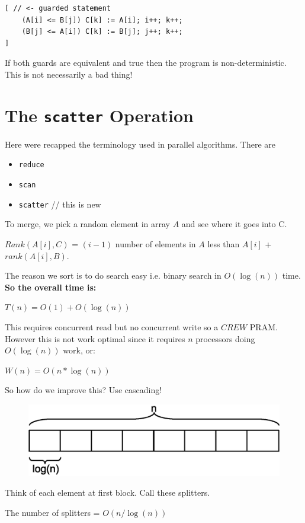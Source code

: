 \documentclass[twoside]{article}
\begin{document}
\begin{lstlisting}
[ // <- guarded statement
	(A[i] <= B[j]) C[k] := A[i]; i++; k++;
	(B[j] <= A[i]) C[k] := B[j]; j++; k++;
]
\end{lstlisting}
If both guards are equivalent and true then the program is non-deterministic. This is not necessarily a bad thing!

\section{The \texttt{scatter} Operation}
Here were recapped the terminology used in parallel algorithms. There are
\begin{itemize}
	\item \texttt{reduce}
	\item \texttt{scan}
	\item \texttt{scatter} // this is new
\end{itemize}

To merge, we pick a random element in array $A$ and see where it goes into C.

$Rank(A[i],C)$ = $(i-1)$ number of elements in $A$ less than $A[i]$ + $rank(A[i],B)$.

The reason we sort is to do search easy i.e. binary search in $O(\log(n))$ time.
\textbf{So the overall time is:}

$T(n) = O(1) + O(\log(n))$

This requires concurrent read but no concurrent write so a $CREW$ PRAM. However this is not work optimal since it requires $n$ processors doing $O(\log(n))$ work, or:

$W(n) = O(n * \log(n))$

So how do we improve this? Use cascading!

\begin{figure}[h]
\center
\includegraphics[scale=0.5]{img/cascade_split.eps}
\end{figure}

Think of each element at first block. Call these splitters. 

The number of splitters = $O(n/\log(n))$
\end{document}
